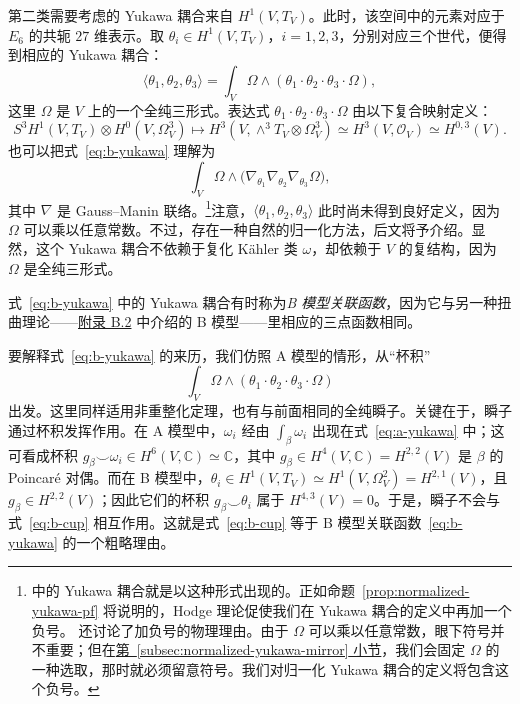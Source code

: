 第二类需要考虑的 Yukawa 耦合来自 $H^1(V,T_V)$。此时，该空间中的元素对应于 $E_6$ 的共轭 $27$ 维表示。取 $\theta_i\in H^1(V,T_V)$，$i=1,2,3$，分别对应三个世代，便得到相应的 Yukawa 耦合：
\begin{equation}\label{eq:b-yukawa}
\langle\theta_1,\theta_2,\theta_3\rangle
=\int_V\Omega\wedge(\theta_1\cdot\theta_2\cdot\theta_3\cdot\Omega),
\end{equation}
这里 $\Omega$ 是 $V$ 上的一个全纯三形式。表达式 $\theta_1\cdot\theta_2\cdot\theta_3\cdot\Omega$ 由以下复合映射定义：
\[
S^3H^1(V,T_V)\otimes H^0(V,\Omega_V^3)
\longmapsto H^3(V,\wedge^3T_V\otimes\Omega_V^3)
\simeq H^3(V,\mathcal O_V)\simeq H^{0,3}(V).
\]
也可以把式~\eqref{eq:b-yukawa} 理解为
\[
\int_V\Omega\wedge
\bigl(\nabla_{\theta_1}\nabla_{\theta_2}\nabla_{\theta_3}\Omega\bigr),
\]
其中 $\nabla$ 是 Gauss--Manin 联络。\footnote{ 中的 Yukawa 耦合就是以这种形式出现的。正如命题~\ref{prop:normalized-yukawa-pf} 将说明的，Hodge 理论促使我们在 Yukawa 耦合的定义中再加一个负号。 还讨论了加负号的物理理由。由于 $\Omega$ 可以乘以任意常数，眼下符号并不重要；但在\hyperref[subsec:normalized-yukawa-mirror]{第~\ref*{subsec:normalized-yukawa-mirror} 小节}，我们会固定 $\Omega$ 的一种选取，那时就必须留意符号。我们对归一化 Yukawa 耦合的定义将包含这个负号。}注意，$\langle\theta_1,\theta_2,\theta_3\rangle$ 此时尚未得到良好定义，因为 $\Omega$ 可以乘以任意常数。不过，存在一种自然的归一化方法，后文将予介绍。显然，这个 Yukawa 耦合不依赖于复化 Kähler 类 $\omega$，却依赖于 $V$ 的复结构，因为 $\Omega$ 是全纯三形式。

式~\eqref{eq:b-yukawa} 中的 Yukawa 耦合有时称为\emph{B 模型关联函数}，因为它与另一种扭曲理论——\hyperref[sec:nonlinear-sigma-models]{附录 B.2} 中介绍的 B 模型——里相应的三点函数相同。

要解释式~\eqref{eq:b-yukawa} 的来历，我们仿照 A 模型的情形，从“杯积”
\begin{equation}\label{eq:b-cup}
\int_V\Omega\wedge(\theta_1\cdot\theta_2\cdot\theta_3\cdot\Omega)
\end{equation}
出发。这里同样适用非重整化定理，也有与前面相同的全纯瞬子。关键在于，瞬子通过杯积发挥作用。在 A 模型中，$\omega_i$ 经由 $\int_\beta\omega_i$ 出现在式~\eqref{eq:a-yukawa} 中；这可看成杯积 $g_\beta\smile\omega_i\in H^6(V,\mathbb C)\simeq\mathbb C$，其中 $g_\beta\in H^4(V,\mathbb C)=H^{2,2}(V)$ 是 $\beta$ 的 Poincaré 对偶。而在 B 模型中，$\theta_i\in H^1(V,T_V)\simeq H^1(V,\Omega_V^2)=H^{2,1}(V)$，且 $g_\beta\in H^{2,2}(V)$；因此它们的杯积 $g_\beta\smile\theta_i$ 属于 $H^{4,3}(V)=0$。于是，瞬子不会与式~\eqref{eq:b-cup} 相互作用。这就是式~\eqref{eq:b-cup} 等于 B 模型关联函数~\eqref{eq:b-yukawa} 的一个粗略理由。

